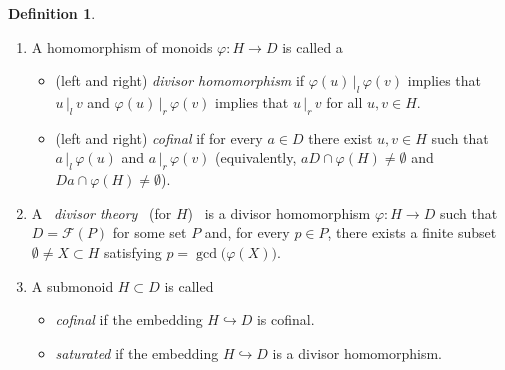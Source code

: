 \documentclass[a4paper]{amsart}
\theoremstyle{definition}
\newtheorem{definition}[theorem]{Definition}
\numberwithin{equation}{section}
\begin{document}
\medskip
\begin{definition} \label{4.1}~
\begin{enumerate}
\item A homomorphism of monoids  $\varphi \colon H \to D$ is called a
      \begin{itemize}
      \smallskip
      \item (left and right) {\it divisor homomorphism} if  $\varphi (u) {\, |_l \,} \varphi (v)$ implies that $u {\, |_l \,}
            v$ and $\varphi (u) {\, |_r \,} \varphi (v)$ implies that $u {\, |_r \,} v$
            for all $u, v \in H$.

      \smallskip
      \item (left and right) {\it cofinal} if for every $a \in D$ there exist
      $u, v \in H$ such that $a {\, |_l \,} \varphi (u)$ and $a {\, |_r \,} \varphi
      (v)$ (equivalently, $aD \cap \varphi (H) \ne \emptyset$ and
      $Da \cap \varphi (H) \ne \emptyset$).
      \end{itemize}

\smallskip
\item A  \ {\it divisor theory} \ (for $H$) \ is a divisor
      homomorphism $\varphi \colon H \to D$ such that $D = \mathcal F(P)$
      for some set $P$ and, for every $p \in P$, there exists a finite
      subset $\emptyset \ne X \subset H$ satisfying $p = \gcd \bigl(
      \varphi(X) \bigr)$.

\smallskip
\item A submonoid $H \subset D$ is called
      \begin{itemize}
      \smallskip
      \item {\it cofinal} if the embedding $H \hookrightarrow D$ is
            cofinal.

      \smallskip
      \item {\it saturated} if the embedding  $H \hookrightarrow D$
            is a divisor homomorphism.
      \end{itemize}
\end{enumerate}
\end{definition}
\end{document}
